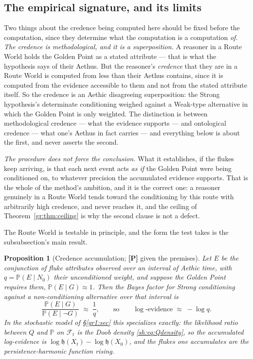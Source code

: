 \documentclass[11pt]{article}
\numberwithin{equation}{section}
\theoremstyle{plain}
\newtheorem{proposition}[theorem]{Proposition}
\theoremstyle{definition}
\theoremstyle{remark}
\newcommand{\PP}{\mathbb{P}}
\newcommand{\Fc}{\mathcal{F}}
\newcommand{\hm}{\mathfrak{h}}
\begin{document}
\subsection{The empirical signature, and its limits}\label{gc:sub:credencemethod}

Two things about the credence being computed here should be fixed before
the computation, since they determine what the computation is a
computation \emph{of}. \emph{The credence is methodological, and it is a superposition.} A
reasoner in a Route World holds the Golden Point as a stated attribute
--- that is what the hypothesis says of their Aethus. But the reasoner's
\emph{credence} that they are in a Route World is computed from less
than their Aethus contains, since it is computed from the evidence
accessible to them and not from the stated attribute itself. So the
credence is an Aethic disagreeing superposition: the Strong hypothesis's
determinate conditioning weighed against a Weak-type alternative in which
the Golden Point is only weighted. The distinction is between
methodological credence --- what the evidence supports --- and
ontological credence --- what one's Aethus in fact carries --- and
everything below is about the first, and never asserts the second.

\emph{The procedure does not force the conclusion.} What it establishes,
if the flukes keep arriving, is that each next event acts \emph{as if}
the Golden Point were being conditioned on, to whatever precision the
accumulated evidence supports. That is the whole of the method's
ambition, and it is the correct one: a reasoner genuinely in a Route
World tends toward the conditioning by this route with arbitrarily high
credence, and never reaches it, and the ceiling of
Theorem~\ref{gr:thm:ceiling} is why the second clause is not a defect.

The Route World is testable in
principle, and the form the test takes is the subsubsection's main
result.

\begin{proposition}[Credence accumulation; \textbf{[P]} given the
premises]\label{gc:prop:credence}
Let $E$ be the conjunction of fluke attributes observed over an interval
of Aethic time, with $q=\PP(E\mid N_0)$ their unconditioned weight, and
suppose the Golden Point requires them, $\PP(E\mid G)\approx1$. Then the
Bayes factor for Strong conditioning against a non-conditioning
alternative over that interval is
\begin{equation}\label{gc:eq:bayesq}
\frac{\PP(E\mid G)}{\PP(E\mid \neg G)}\;\approx\;\frac1q,
\qquad\text{so}\qquad
\log\text{-evidence}\;\approx\;-\log q .
\end{equation}
In the stochastic model of \S\ref{gr1:sec} this specializes exactly:
the likelihood ratio between $Q$ and $\PP$ on $\Fc_t$ is the Doob
density \eqref{sh:eq:Qdensity}, so the accumulated log-evidence is
$\log\hm(X_t)-\log\hm(X_0)$, and \emph{the flukes one accumulates are
the persistence-harmonic function rising}.
\end{proposition}
\end{document}

